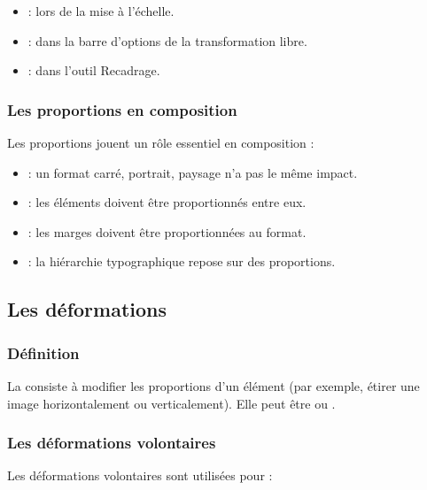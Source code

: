 \begin{itemize}
    \item {} : lors de la mise à l'échelle.
    \item {} : dans la barre d'options de la transformation libre.
    \item {} : dans l'outil Recadrage.
\end{itemize}

\subsubsection{Les proportions en composition}

Les proportions jouent un rôle essentiel en composition :

\begin{itemize}
    \item {} : un format carré, portrait, paysage n'a pas le même impact.
    \item {} : les éléments doivent être proportionnés entre eux.
    \item {} : les marges doivent être proportionnées au format.
    \item {} : la hiérarchie typographique repose sur des proportions.
\end{itemize}

\subsection{Les déformations}

\subsubsection{Définition}

La  consiste à modifier les proportions d'un élément (par exemple, étirer une image horizontalement ou verticalement). Elle peut être  ou .

\subsubsection{Les déformations volontaires}

Les déformations volontaires sont utilisées pour :

